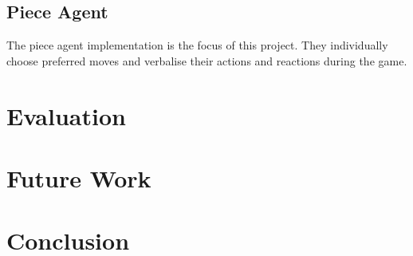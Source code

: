 \documentclass[conference]{IEEEtran}
\begin{document}
\subsection{Piece Agent}

The piece agent implementation is the focus of this project. They individually choose preferred moves and verbalise their actions and reactions during the game.


\section{Evaluation}

\section{Future Work}

\section{Conclusion}




\vspace{12pt}
\end{document}
